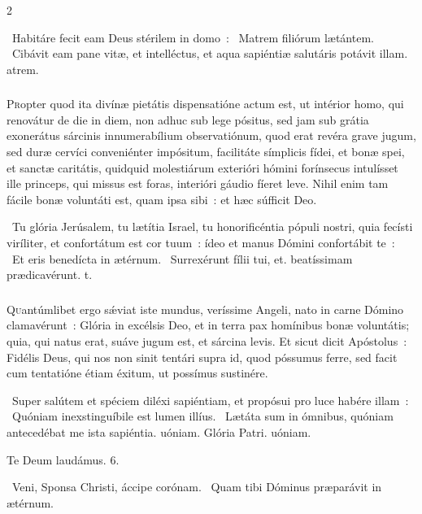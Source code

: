 \documentclass[9pt,twoside]{extarticle}
\begin{document}
\begin{multicols}{2}
{\begin{tightlist}{}
\item {}~Habitáre fecit eam Deus stérilem in domo~: \textred{*}~Matrem filiórum lætántem. ~Cibávit eam pane vitæ, et intelléctus, et aqua sapiéntiæ salutáris potávit illam. atrem.
\end{tightlist}

\subsubsection*{\center {}}
\lettrine{P}ropter quod ita divínæ pietátis dispensatióne actum est, ut intérior homo, qui renovátur de die in diem, non adhuc sub lege pósitus, sed jam sub grátia exonerátus sárcinis innumerabílium observatiónum, quod erat revéra grave jugum, sed duræ cervíci conveniénter impósitum, facilitáte símplicis fídei, et bonæ spei, et sanctæ caritátis, quidquid molestiárum exterióri hómini forínsecus intulísset ille princeps, qui missus est foras, interióri gáudio fíeret leve. Nihil enim tam fácile bonæ voluntáti est, quam ipsa sibi~: et hæc súfficit Deo.

\begin{tightlist}{}
\item {}~Tu glória Jerúsalem, tu lætítia Israel, tu honorificéntia pópuli nostri, quia fecísti viríliter, et confortátum est cor tuum~: ídeo et manus Dómini confortábit te~: \textred{*}~Et eris benedícta in ætérnum. ~Surrexérunt fílii tui, et. beatíssimam prædicavérunt. t.
\end{tightlist}

\subsubsection*{\center {}}
\lettrine{Q}uantúmlibet ergo sǽviat iste mundus, veríssime Angeli, nato in carne Dómino clamavérunt~: Glória in excélsis Deo, et in terra pax homínibus bonæ voluntátis; quia, qui natus erat, suáve jugum est, et sárcina levis. Et sicut dicit Apóstolus~: Fidélis Deus, qui nos non sinit tentári supra id, quod póssumus ferre, sed facit cum tentatióne étiam éxitum, ut possímus sustinére.

\begin{tightlist}{}
\item {}~Super salútem et spéciem diléxi sapiéntiam, et propósui pro luce habére illam~: \textred{*}~Quóniam inexstinguíbile est lumen illíus. ~Lætáta sum in ómnibus, quóniam antecedébat me ista sapiéntia. uóniam. Glória Patri. uóniam.
\item Te Deum laudámus. 6.
\item {}~Veni, Sponsa Christi, áccipe corónam. ~Quam tibi Dóminus præparávit in ætérnum.
\end{tightlist}

}
\end{multicols}
\end{document}
